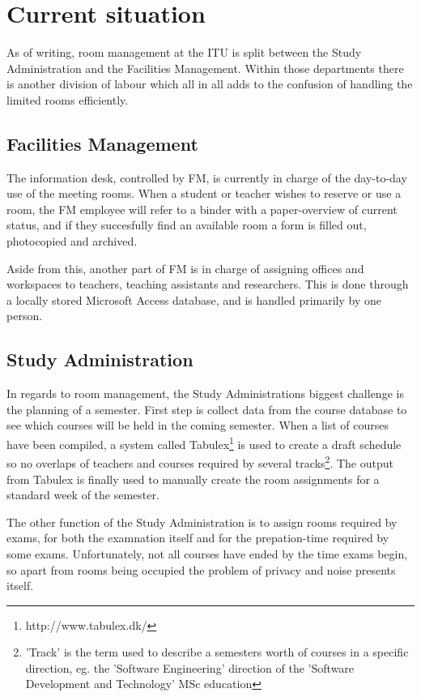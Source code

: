 \pagebreak
\label{sec:current_situation}
\section{Current situation}
As of writing, room management at the ITU is split between the Study Administration and the Facilities Management. Within those departments there is another division of labour which all in all adds to the confusion of handling the limited rooms efficiently.

\subsection{Facilities Management}
The information desk, controlled by FM, is currently in charge of the day-to-day use of the meeting rooms. When a student or teacher wishes to reserve or use a room, the FM employee will refer to a binder with a paper-overview of current status, and if they succesfully find an available room a form is filled out, photocopied and archived.

Aside from this, another part of FM is in charge of assigning offices and workspaces to teachers, teaching assistants and researchers. This is done through a locally stored Microsoft Access database, and is handled primarily by one person.

\subsection{Study Administration}
In regards to room management, the Study Administrations biggest challenge is the planning of a semester. First step is collect data from the course database to see which courses will be held in the coming semester. When a list of courses have been compiled, a system called Tabulex\footnote{http://www.tabulex.dk/} is used to create a draft schedule so no overlaps of teachers and courses required by several tracks\footnote{'Track' is the term used to describe a semesters worth of courses in a specific direction, eg. the 'Software Engineering' direction of the 'Software Development and Technology' MSc education}. The output from Tabulex is finally used to manually create the room assignments for a standard week of the semester.

The other function of the Study Administration is to assign rooms required by exams, for both the examnation itself and for the prepation-time required by some exams. Unfortunately, not all courses have ended by the time exams begin, so apart from rooms being occupied the problem of privacy and noise presents itself.\\

